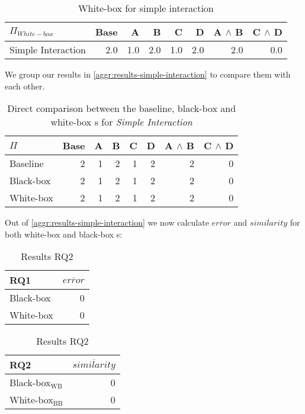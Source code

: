\begin{table}[H]
    \centering
    \begin{tabular}{lrrrrrrr}
    \toprule
    $\Pi_{White-box}$    & Base & A & B & C & D & A $\land$ B & C $\land$ D  \\
    \midrule
    Simple Interaction &   2.0 &  1.0 &  2.0 &  1.0 &  2.0 &   2.0 &  0.0 \\
    \bottomrule
    \end{tabular}
    \caption{White-box {\perfInfluenceModel} for simple interaction}
\end{table}

We group our results in \autoref{aggr:results-simple-interaction} to compare them with each other.

\begin{table}[H]
    \centering
    \begin{tabular}{lrrrrrrr}
    \toprule
    $\Pi$    & Base & A & B & C & D & A $\land$ B & C $\land$ D  \\ \midrule
    Baseline & 2    & 1 & 2 & 1 & 2 & 2           & 0            \\
    Black-box & 2    & 1 & 2 & 1 & 2 & 2           & 0           \\
    White-box & 2    & 1 & 2 & 1 & 2 & 2           & 0           \\ \bottomrule
    \end{tabular}  
    \caption{Direct comparison between the baseline, black-box and white-box {\perfInfluenceModel}s for \emph{Simple Interaction}}\label{aggr:results-simple-interaction}
\end{table}

Out of \autoref{aggr:results-simple-interaction} we now calculate $\overline{error}$ and $\overline{similarity}$
for both white-box and black-box {\perfInfluenceModel}s:

\begin{table}[H]
\begin{minipage}{.5\linewidth}
    \centering
    \begin{tabular}{lr}
    \toprule
    RQ1     & $\overline{error}$         \\ \midrule
    Black-box & 0              \\
    White-box & 0              \\ \bottomrule
    \end{tabular}  
    \caption{Results RQ1}
\end{minipage}%
\begin{minipage}{.5\linewidth}
    \centering
    \begin{tabular}{lr}
        \toprule
        RQ2     & $\overline{similarity}$    \\ \midrule
        Black-box$_\text{WB}$ & 0              \\
        White-box$_\text{BB}$ & 0              \\ \bottomrule
        \end{tabular}  
        \caption{Results RQ2}
\end{minipage} 
\end{table}


